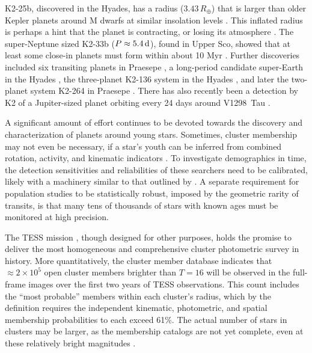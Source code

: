\documentclass[12pt,twocolumn,tighten]{aastex62}
\begin{document}
K2-25b, discovered in the Hyades, has a radius ($3.43\,R_\oplus$) that
is larger than older Kepler planets around M dwarfs at similar insolation levels
\citep{Mann_K2_25_2016}.  This inflated radius is perhaps a hint that
the planet is contracting, or losing its atmosphere \citep[{\it
e.g.},][]{Fortney_et_al_2007,Owen_Wu_2013,Fulton_et_al_2017}.  The
super-Neptune sized K2-33b ($P\approx 5.4\,{\rm d}$), found in Upper
Sco, showed that at least some close-in planets must form within about
10 Myr \citep{Mann_K2_33b_2016,David_et_al_2017}.  Further discoveries
included six transiting planets in Praesepe
\citep{obermeier_k2_2016,Mann_et_al_2017}, a long-period candidate
super-Earth in the Hyades \citep{vanderburg_zeitVII_2018}, the
three-planet K2-136 system in the Hyades
\citep{ciardi_k2-136_2018,livingston_three_2018,mann_ZEITVI_2018}, and
later the two-planet system K2-264 in Praesepe
\citep{rizzuto_zeitVIII_2018,livingston_k2-264_2019}.  There has also
recently been a detection by K2 of a Jupiter-sized planet orbiting
every 24 days around V1298~Tau \citep{david_v1298_2019}.

A significant amount of effort continues to be devoted towards the
discovery and characterization of planets around young stars.
Sometimes, cluster membership may not even be necessary, if a star's
youth can be inferred from combined rotation, activity, and kinematic
indicators \citep[{e.g.}, K2-233;][]{david_k2-233_2018}.  To
investigate demographics in time, the detection sensitivities and
reliabilities of these searchers need to be calibrated, likely with a
machinery similar to that outlined by \citet{rizzuto_zeitV_2017}.  A
separate requirement for population studies to be statistically
robust, imposed by the geometric rarity of transits, is that many tens
of thousands of stars with known ages must be monitored at high
precision.

The TESS mission \citep{ricker_transiting_2015}, though designed for
other purposes, holds the promise to deliver the most homogeneous and
comprehensive cluster photometric survey in history.  More
quantitatively, the \citet{Kharchenko_et_al_2013} cluster member
database indicates that $\approx 2\times10^5$ open cluster members
brighter than $T=16$ will be observed in the full-frame images over
the first two years of TESS observations.  This count includes the
``most probable'' members within each cluster's radius, which by the
\citet[][]{kharchenko_global_2012} definition requires the independent
kinematic, photometric, and spatial membership probabilities to each
exceed 61\%.  The actual number of stars in clusters may be larger, as
the membership catalogs are not yet complete, even at these relatively
bright magnitudes \citep[{\it
e.g.},][]{roser_nine_RSG_2016,cantat-gaudin_gaia_2018,cantat-gaudin_newOCs_2019}.
\end{document}
